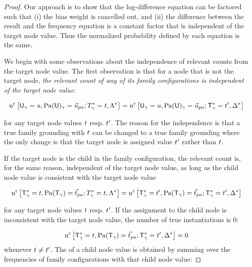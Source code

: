 \documentclass[twoside,11pt]{article}
\newcommand{\keypoint}[1]{{\em #1}}
\begin{document}
\begin{proof} Our approach is to show that the log-difference equation can be factored such that (i) the bias weight is cancelled out,  and (ii) the difference between the result and the frequency equation is a constant factor that is independent of the target node value. Thus the normalized probability defined by each equation is the same.

We begin with some observations about the independence of relevant counts from the target node value. The first observation is that for a node that is not the target node, \keypoint {the relevant count of any of its family configurations is independent of the target node value}:

\newcommand{\Qconjnew}{\Appendterm{\FG{\Ground{\TI}} = \TV'} {\DB}}

\begin{equation} \label{eq:independent-family}
 \Relcount{\Appendterm{\Ground{\UI}  = \UV} {\Ground{\Pa{\UI}} = \Prange{\UT}}} {\Qconj} =
 \Relcount{\Appendterm{\Ground{\UI}  = \UV} {\Ground{\Pa{\UI}} = \Prange{\UT}}} {\Qconjnew}
\end{equation}

\noindent for any target node values $t$ resp. $t'$. The reason for the independence is that a true family grounding with $t$ can be changed to a true family grounding where the only change is that the target node is assigned value $t'$ rather than $t$. 

If the target node is the child in the family configuration, the relevant count is, for the same reason, independent of the target node value, as long as the child node value is consistent with the target node value

\begin{equation} \label{eq:independent-target-child}
 \Relcount{\Appendterm{\FG{\Ground{\TI}} = \TV} {\Pa{\Ground{\TI}} = \Prange{\TT}}} {\Qconj} =
 \Relcount{\Appendterm{\FG{\Ground{\TI}} = \TV'} {\Pa{\Ground{\TI}} = \Prange{\TT}}} {\Qconjnew}
\end{equation}

\noindent for any target node values $t$ resp. $t'$. If the assignment to the child node is inconsistent with the target node value, the number of true instantiations is 0:

\begin{equation} \label{eq:inconsistent}
 \Relcount{\Appendterm{\FG{\Ground{\TI}} = \TV} {\Pa{\Ground{\TI}} = \Prange{\TT}}} {\Qconjnew} =
 0
\end{equation}
whenever $t \neq t'$. 
%
The  of a child node value is obtained by summing over the frequencies of family configurations with that child node value:


\end{proof}
\end{document}
